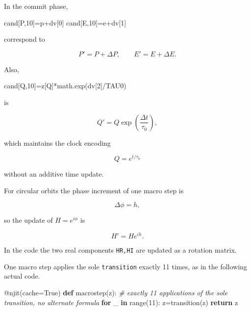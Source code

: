 \documentclass[
  a4paper,
]{article}
\newenvironment{Shaded}{}{}
\newcommand{\AttributeTok}[1]{\textcolor[rgb]{0.49,0.56,0.16}{#1}}
\newcommand{\BuiltInTok}[1]{\textcolor[rgb]{0.00,0.50,0.00}{#1}}
\newcommand{\CommentTok}[1]{\textcolor[rgb]{0.38,0.63,0.69}{\textit{#1}}}
\newcommand{\ControlFlowTok}[1]{\textcolor[rgb]{0.00,0.44,0.13}{\textbf{#1}}}
\newcommand{\DecValTok}[1]{\textcolor[rgb]{0.25,0.63,0.44}{#1}}
\newcommand{\KeywordTok}[1]{\textcolor[rgb]{0.00,0.44,0.13}{\textbf{#1}}}
\newcommand{\NormalTok}[1]{#1}
\newcommand{\OperatorTok}[1]{\textcolor[rgb]{0.40,0.40,0.40}{#1}}
\newcommand{\VariableTok}[1]{\textcolor[rgb]{0.10,0.09,0.49}{#1}}
\begin{document}
In the commit phase,

\begin{Shaded}
\begin{Highlighting}[]
\NormalTok{cand[P,}\DecValTok{10}\NormalTok{]}\OperatorTok{=}\NormalTok{p}\OperatorTok{+}\NormalTok{dv[}\DecValTok{0}\NormalTok{]}
\NormalTok{cand[E,}\DecValTok{10}\NormalTok{]}\OperatorTok{=}\NormalTok{e}\OperatorTok{+}\NormalTok{dv[}\DecValTok{1}\NormalTok{]}
\end{Highlighting}
\end{Shaded}

correspond to

\[
P'=P+\Delta P,
\qquad
E'=E+\Delta E.
\]

Also,

\begin{Shaded}
\begin{Highlighting}[]
\NormalTok{cand[Q,}\DecValTok{10}\NormalTok{]}\OperatorTok{=}\NormalTok{z[Q]}\OperatorTok{*}\NormalTok{math.exp(dv[}\DecValTok{2}\NormalTok{]}\OperatorTok{/}\NormalTok{TAU0)}
\end{Highlighting}
\end{Shaded}

is

\[
Q'=Q\exp\left(\frac{\Delta t}{\tau_0}\right),
\]

which maintains the clock encoding

\[
Q=e^{t/\tau_0}
\]

without an additive time update.

For circular orbits the phase increment of one macro step is

\[
\Delta\phi=h,
\]

so the update of \(H=e^{i\phi}\) is

\[
H'=He^{ih}.
\]

In the code the two real components \texttt{HR,HI} are updated as a
rotation matrix.

One macro step applies the sole \texttt{transition} exactly 11 times, as
in the following actual code.

\begin{Shaded}
\begin{Highlighting}[]
\AttributeTok{@njit}\NormalTok{(cache}\OperatorTok{=}\VariableTok{True}\NormalTok{)}
\KeywordTok{def}\NormalTok{ macrostep(z):}
    \CommentTok{\# exactly 11 applications of the sole transition, no alternate formula}
    \ControlFlowTok{for}\NormalTok{ \_ }\KeywordTok{in} \BuiltInTok{range}\NormalTok{(}\DecValTok{11}\NormalTok{): z}\OperatorTok{=}\NormalTok{transition(z)}
    \ControlFlowTok{return}\NormalTok{ z}
\end{Highlighting}
\end{Shaded}
\end{document}
